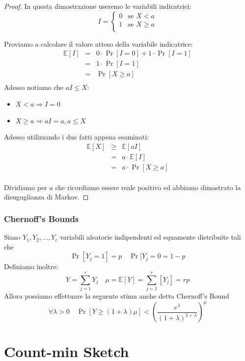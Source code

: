 \documentclass[a4paper,11pt]{book}
\begin{document}
\begin{proof}
In questa dimostrazione useremo le variabili indicatrici:
$$ I = \begin{cases} 
0 & \mbox{se } X < a \\
1 & \mbox{se } X \geq a \\
\end{cases} $$

Proviamo a calcolare il valore atteso della variabile indicatrice:
\begin{eqnarray}
\mathbb{E}[I] & = & 0 \cdot \Pr[I = 0] + 1 \cdot \Pr[I = 1] \nonumber \\
& = & 1 \cdot \Pr[I = 1] \nonumber \\
& = & \Pr[X \geq a] \nonumber \\
\end{eqnarray}
Adesso notiamo che $aI \leq X$:
\begin{itemize}
\item $X < a \Rightarrow I = 0$
\item $X \geq a \Rightarrow aI = a, a \leq X$
\end{itemize}
Adesso utilizzando i due fatti appena esaminati:
\begin{eqnarray}
\mathbb{E}[X] & \geq & \mathbb{E}[aI] \nonumber \\
& = & a \cdot \mathbb{E}[I] \nonumber \\
& = & a \cdot \Pr[X \geq a] \nonumber \\
\end{eqnarray}

Dividiamo per $a$ che ricordiamo essere reale positivo ed abbiamo dimostrato la disuguglianza di Markov.

\end{proof}

\subsection{Chernoff's Bounds}

Siano $Y_1, Y_2, \ldots, Y_r$ variabili aleatorie indipendenti ed equamente distribuite tali che $$\Pr[Y_j = 1] = p \quad \Pr[Y_j = 0 = 1-p$$
Definiamo inoltre: $$ Y = \sum_{j=1}^{r} Y_j \quad \mu = \mathbb{E}[Y] = \sum_{j=1}^{r}[Y_j] = rp$$ Allora possiamo effettuare la seguente stima anche detta Chernoff's Bound
$$\forall \lambda > 0 \quad \Pr[Y \geq (1+\lambda)\mu] < \left( \frac{e^{\lambda}}{(1+\lambda)^{1+\lambda}}\right)^{\mu}$$

\chapter{Count-min Sketch}
\end{document}
